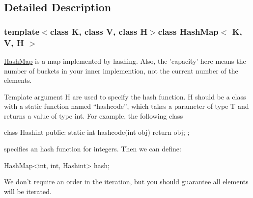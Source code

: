 \subsection{Detailed Description}
\subsubsection*{template$<$class K, class V, class H$>$class HashMap$<$ K, V, H $>$}

\hyperlink{class_hash_map}{HashMap} is a map implemented by hashing. Also, the 'capacity' here means the number of buckets in your inner implemention, not the current number of the elements.

Template argument H are used to specify the hash function. H should be a class with a static function named ``hashcode'', which takes a parameter of type T and returns a value of type int. For example, the following class 
\begin{DoxyCode}
      class Hashint {
      public:
          static int hashcode(int obj) {
              return obj;
          }
      };
\end{DoxyCode}
 specifies an hash function for integers. Then we can define: 
\begin{DoxyCode}
      HashMap<int, int, Hashint> hash;
\end{DoxyCode}


We don't require an order in the iteration, but you should guarantee all elements will be iterated. 

